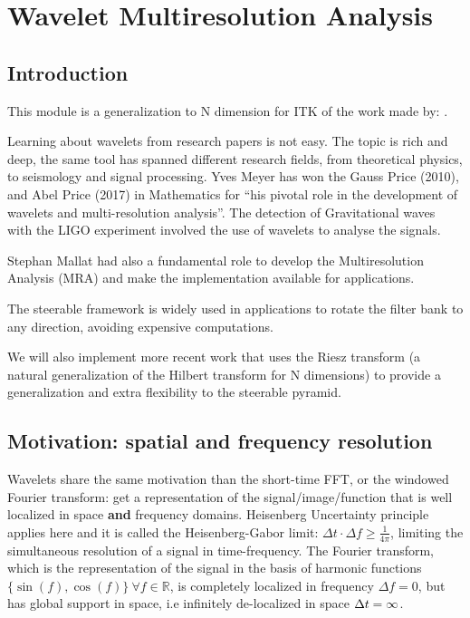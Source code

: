 \documentclass{InsightArticle}
\theoremstyle{definition}
\newcommand{\IJhandlerIDnumber}{3558}
\begin{document}
\IJhandlenote{\IJhandlerIDnumber}

\tableofcontents

\section{Wavelet Multiresolution Analysis}
\label{sec:first}

\subsection{Introduction}
\label{sub:introduction}
This module is a generalization to N dimension for ITK of the work made by: \cite{freeman_design_1991, simoncelli_steerable_1995, kovesi_image_1999, held_steerable_2010,chenouard_3d_2012, unser_steerable_2011, pad_vow:_2014}.

Learning about wavelets from research papers is not easy. The topic is rich and deep, the same tool has spanned different research fields, from theoretical physics, to seismology and signal processing.
Yves Meyer has won the Gauss Price (2010), and Abel Price (2017) in Mathematics for ``his pivotal role in the development of wavelets and multi-resolution analysis''. The detection of Gravitational waves with the LIGO experiment involved the use of wavelets to analyse the signals.

Stephan Mallat \cite{mallat_theory_1989} had also a fundamental role to develop the Multiresolution Analysis (MRA) and make the implementation available for applications.

The steerable framework \cite{freeman_design_1991, simoncelli_steerable_1995} is widely used in applications to rotate the filter bank to any direction, avoiding expensive computations.

We will also implement more recent work \cite{held_steerable_2010, unser_steerable_2011, chenouard_3d_2012} that uses the Riesz transform (a natural generalization of the Hilbert transform for N dimensions) to provide a generalization and extra flexibility to the steerable pyramid.

\subsection{Motivation: spatial and frequency resolution}
\label{sub:Motivation}
Wavelets share the same motivation than the short-time FFT, or the windowed Fourier transform: get a representation of the signal/image/function that is well localized in space \textbf{and} frequency domains. Heisenberg Uncertainty principle applies here and it is called the Heisenberg-Gabor limit: $\Delta t \cdot \Delta f \geq \frac{1}{4\pi}$, limiting the simultaneous resolution of a signal in time-frequency.
The Fourier transform, which is the representation of the signal in the basis of harmonic functions $\{\sin(f),\cos(f)\}\ \forall f \in \mathbb{R}$, is completely localized in frequency $\Delta f = 0$, but has global support in space, i.e infinitely de-localized in space $\Delta t = \infty$.
\end{document}
